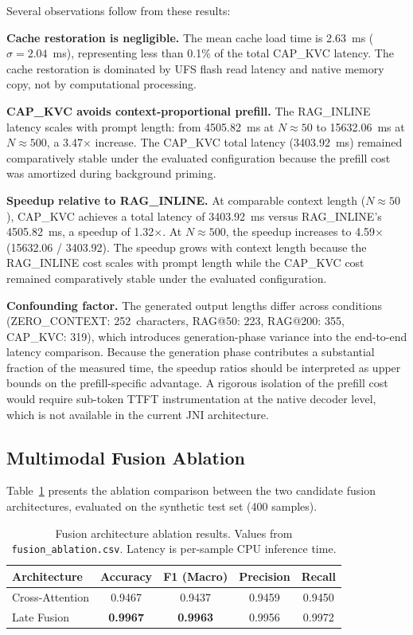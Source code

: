 Several observations follow from these results:

\textbf{Cache restoration is negligible.} The mean cache load time is 2.63~ms ($\sigma = 2.04$~ms), representing less than 0.1\% of the total CAP\_KVC latency. The cache restoration is dominated by UFS flash read latency and native memory copy, not by computational processing.

\textbf{CAP\_KVC avoids context-proportional prefill.} The RAG\_INLINE latency scales with prompt length: from 4505.82~ms at $N \approx 50$ to 15632.06~ms at $N \approx 500$, a 3.47$\times$ increase. The CAP\_KVC total latency (3403.92~ms) remained comparatively stable under the evaluated configuration because the prefill cost was amortized during background priming.

\textbf{Speedup relative to RAG\_INLINE.} At comparable context length ($N \approx 50$), CAP\_KVC achieves a total latency of 3403.92~ms versus RAG\_INLINE's 4505.82~ms, a speedup of 1.32$\times$. At $N \approx 500$, the speedup increases to 4.59$\times$ (15632.06 / 3403.92). The speedup grows with context length because the RAG\_INLINE cost scales with prompt length while the CAP\_KVC cost remained comparatively stable under the evaluated configuration.

\textbf{Confounding factor.} The generated output lengths differ across conditions (ZERO\_CONTEXT: 252~characters, RAG@50: 223, RAG@200: 355, CAP\_KVC: 319), which introduces generation-phase variance into the end-to-end latency comparison. Because the generation phase contributes a substantial fraction of the measured time, the speedup ratios should be interpreted as upper bounds on the prefill-specific advantage. A rigorous isolation of the prefill cost would require sub-token TTFT instrumentation at the native decoder level, which is not available in the current JNI architecture.

\subsection{Multimodal Fusion Ablation}
\label{sec:results_fusion}

Table~\ref{tab:fusion} presents the ablation comparison between the two candidate fusion architectures, evaluated on the synthetic test set (400 samples).

\begin{table}[htbp]
\centering
\caption{Fusion architecture ablation results. Values from \texttt{fusion\_ablation.csv}. Latency is per-sample CPU inference time.}
\label{tab:fusion}
\begin{tabular}{lcccc}
\hline
\textbf{Architecture} & \textbf{Accuracy} & \textbf{F1 (Macro)} & \textbf{Precision} & \textbf{Recall} \\
\hline
Cross-Attention & 0.9467 & 0.9437 & 0.9459 & 0.9450 \\
Late Fusion     & \textbf{0.9967} & \textbf{0.9963} & 0.9956 & 0.9972 \\
\hline
\end{tabular}
\end{table}

